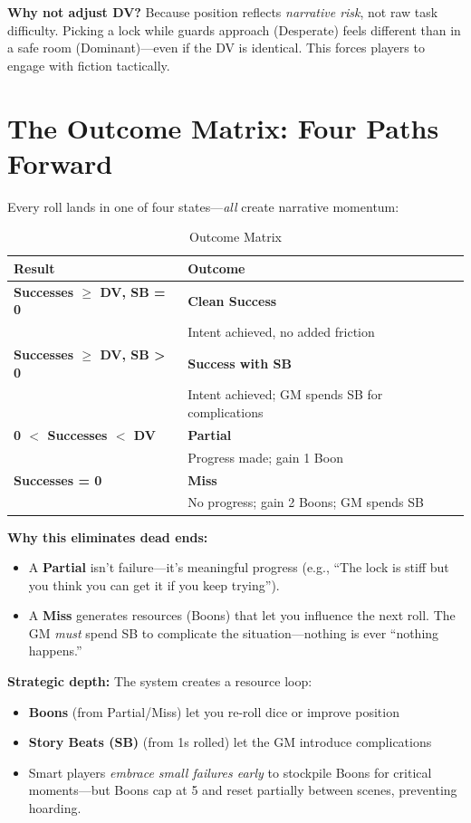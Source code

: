 \documentclass[11pt]{article}
\begin{document}
\textbf{Why not adjust DV?} Because position reflects \textit{narrative risk}, not raw task difficulty. Picking a lock while guards approach (Desperate) feels different than in a safe room (Dominant)—even if the DV is identical. This forces players to engage with fiction tactically.

\section{The Outcome Matrix: Four Paths Forward}

Every roll lands in one of four states—\textit{all} create narrative momentum:

\begin{table}[h]
\centering
\caption{Outcome Matrix}
\begin{tabular}{>{\bfseries}l l}
\toprule
Result & Outcome \\
\midrule
Successes $\geq$ DV, SB = 0 & \textbf{Clean Success} \\
& Intent achieved, no added friction \\
Successes $\geq$ DV, SB > 0 & \textbf{Success with SB} \\
& Intent achieved; GM spends SB for complications \\
0 $<$ Successes $<$ DV & \textbf{Partial} \\
& Progress made; gain 1 Boon \\
Successes = 0 & \textbf{Miss} \\
& No progress; gain 2 Boons; GM spends SB \\
\bottomrule
\end{tabular}
\end{table}

\textbf{Why this eliminates dead ends:}
\begin{itemize}
    \item A \textbf{Partial} isn't failure—it's meaningful progress (e.g., ``The lock is stiff but you think you can get it if you keep trying'').
    \item A \textbf{Miss} generates resources (Boons) that let you influence the next roll. The GM \textit{must} spend SB to complicate the situation—nothing is ever ``nothing happens.''
\end{itemize}

\textbf{Strategic depth:} The system creates a resource loop:
\begin{itemize}
    \item \textbf{Boons} (from Partial/Miss) let you re-roll dice or improve position
    \item \textbf{Story Beats (SB)} (from 1s rolled) let the GM introduce complications
    \item Smart players \textit{embrace small failures early} to stockpile Boons for critical moments—but Boons cap at 5 and reset partially between scenes, preventing hoarding.
\end{itemize}
\end{document}
